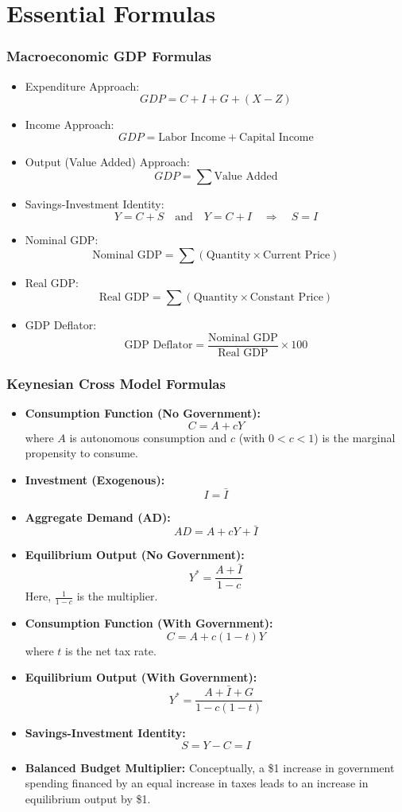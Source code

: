 \chapter*{Essential Formulas}

\subsection*{Macroeconomic GDP Formulas}
\begin{itemize}
    \item Expenditure Approach:
    \[ GDP = C + I + G + (X - Z) \]
    \item Income Approach:
    \[ GDP = \text{Labor Income} + \text{Capital Income} \]
    \item Output (Value Added) Approach:
    \[ GDP = \sum \text{Value Added} \]
    \item Savings-Investment Identity:
    \[ Y = C + S \quad \text{and} \quad Y = C + I \quad \Rightarrow \quad S = I \]
    \item Nominal GDP:
    \[ \text{Nominal GDP} = \sum (\text{Quantity} \times \text{Current Price}) \]
    \item Real GDP:
    \[ \text{Real GDP} = \sum (\text{Quantity} \times \text{Constant Price}) \]
    \item GDP Deflator:
    \[ \text{GDP Deflator} = \frac{\text{Nominal GDP}}{\text{Real GDP}} \times 100 \]
\end{itemize}

\subsection*{Keynesian Cross Model Formulas}
\begin{itemize}
    \item \textbf{Consumption Function (No Government):}
    \[
    C = A + cY
    \]
    where \(A\) is autonomous consumption and \(c\) (with \(0<c<1\)) is the marginal propensity to consume.
    \item \textbf{Investment (Exogenous):}
    \[
    I = \bar{I}
    \]
    \item \textbf{Aggregate Demand (AD):}
    \[
    AD = A + cY + \bar{I}
    \]
    \item \textbf{Equilibrium Output (No Government):}
    \[
    Y^* = \frac{A + \bar{I}}{1 - c}
    \]
    Here, \(\frac{1}{1-c}\) is the multiplier.
    \item \textbf{Consumption Function (With Government):}
    \[
    C = A + c(1-t)Y
    \]
    where \(t\) is the net tax rate.
    \item \textbf{Equilibrium Output (With Government):}
    \[
    Y^* = \frac{A + \bar{I} + G}{1 - c(1-t)}
    \]
    \item \textbf{Savings-Investment Identity:}
    \[
    S = Y - C = I
    \]
    \item \textbf{Balanced Budget Multiplier:} Conceptually, a \$1 increase in government spending financed by an equal increase in taxes leads to an increase in equilibrium output by \$1.
\end{itemize}

